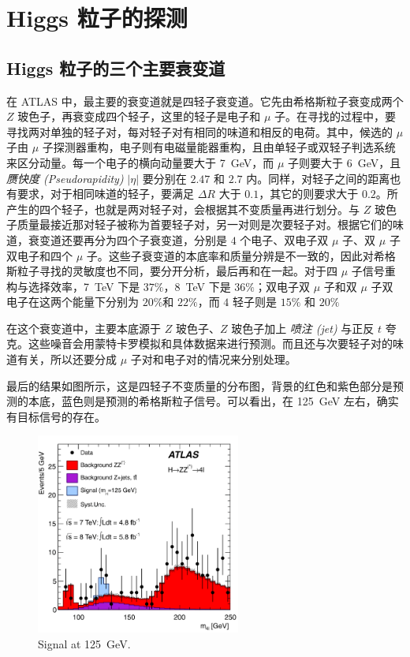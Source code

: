 \chapter{Higgs 粒子的探测}

\section{Higgs 粒子的三个主要衰变道}

在 ATLAS 中，最主要的衰变道就是四轻子衰变道。它先由希格斯粒子衰变成两个 $Z$ 玻色子，再衰变成四个轻子，这里的轻子是电子和 $\mu$ 子。在寻找的过程中，要寻找两对单独的轻子对，每对轻子对有相同的味道和相反的电荷。其中，候选的 $\mu$ 子由 $\mu$ 子探测器重构，电子则有电磁量能器重构，且由单轻子或双轻子判选系统来区分动量。每一个电子的横向动量要大于 \qty{7}{GeV}，而 $\mu$ 子则要大于 \qty{6}{GeV}，且 \emph{赝快度 (Pseudorapidity)} $|\eta|$ 要分别在 $2.47$ 和 $2.7$ 内。同样，对轻子之间的距离也有要求，对于相同味道的轻子，要满足 $\Delta R$ 大于 $0.1$，其它的则要求大于 $0.2$。所产生的四个轻子，也就是两对轻子对，会根据其不变质量再进行划分。与 $Z$ 玻色子质量最接近那对轻子被称为首要轻子对，另一对则是次要轻子对。根据它们的味道，衰变道还要再分为四个子衰变道，分别是 $4$ 个电子、双电子双 $\mu$ 子、双 $\mu$ 子双电子和四个 $\mu$ 子。这些子衰变道的本底率和质量分辨是不一致的，因此对希格斯粒子寻找的灵敏度也不同，要分开分析，最后再和在一起。对于四 $\mu$ 子信号重构与选择效率，\qty{7}{TeV} 下是 $37\%$，\qty{8}{TeV} 下是 $36\%$；双电子双 $\mu$ 子和双 $\mu$ 子双电子在这两个能量下分别为 $20\%$和 $22\%$，而 $4$ 轻子则是 $15\%$ 和 $20\%$

在这个衰变道中，主要本底源于 $Z$ 玻色子、$Z$ 玻色子加上 \emph{喷注 (jet)} 与正反 $t$ 夸克。这些噪音会用蒙特卡罗模拟和具体数据来进行预测。而且还与次要轻子对的味道有关，所以还要分成 $\mu$ 子对和电子对的情况来分别处理。

最后的结果如图所示，这是四轻子不变质量的分布图，背景的红色和紫色部分是预测的本底，蓝色则是预测的希格斯粒子信号。可以看出，在 \qty{125}{GeV} 左右，确实有目标信号的存在。

\begin{figure}[htbp]
    \centering
    \includegraphics[width=0.6\textwidth]{pic/events.png}
    \caption{Signal at \qty{125}{GeV}.}
    \label{fig:events}
\end{figure}

